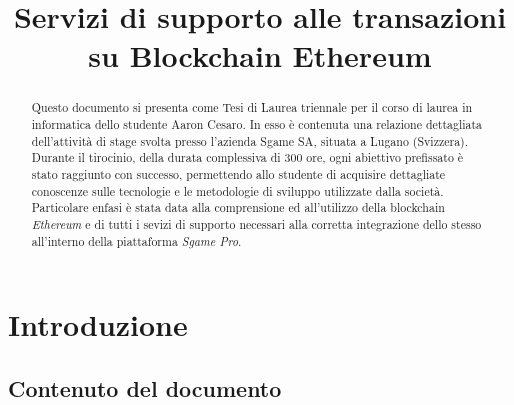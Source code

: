 \documentclass[11pt]{thesistemp}
\title{Servizi di supporto alle transazioni su Blockchain Ethereum}
\begin{document}
\maketitle
\pagebreak
\begin{abstract}
Questo documento si presenta come Tesi di Laurea triennale per il corso di laurea in informatica dello studente Aaron Cesaro. In esso \`e contenuta una relazione dettagliata dell’attivit\`a di stage svolta presso l’azienda Sgame SA, situata a Lugano (Svizzera). Durante il tirocinio, della durata complessiva di 300 ore, ogni abiettivo prefissato \`e stato raggiunto con successo, permettendo allo studente di acquisire dettagliate conoscenze sulle tecnologie e le metodologie di sviluppo utilizzate dalla società.
Particolare enfasi è stata data alla comprensione ed all'utilizzo della blockchain \textit{Ethereum} e di tutti i sevizi di supporto necessari alla corretta integrazione dello stesso all'interno della piattaforma \textit{Sgame Pro}.
\end{abstract}

\tableofcontents


\section{Introduzione}

\subsection{Contenuto del documento}
\end{document}
